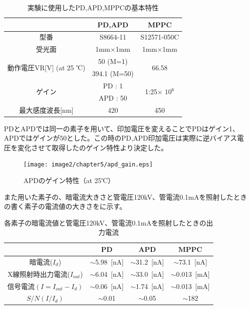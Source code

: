 \begin{table}[H]
  \centering
    \begin{tabular}{ccc}
    \toprule
          & PD,APD  & MPPC \\
    \midrule
    型番    & S8664-11 &  S12571-050C \\
    受光面   & 1mm$\times$1mm & 1mm$\times$1mm \\
    \multirow{2}[0]{*}{動作電圧VR[V] (at 25 ℃)} & 50 (M=1) & \multirow{2}[0]{*}{66.58} \\
          & 394.1 (M=50) &  \\
    \multirow{2}[0]{*}{ゲイン} & PD : 1 & \multirow{2}[0]{*}{1:25$\times$ $10^6$} \\
          & APD : 50 &  \\
    最大感度波長[nm] & 420   & 450 \\
    \bottomrule
    \end{tabular}
     \caption{実験に使用したPD,APD,MPPCの基本特性}
  \label{soshi_tokusei}
\end{table}

PDとAPDでは同一の素子を用いて、印加電圧を変えることでPDはゲイン1、APDではゲインが50とした。この時のPD,APD印加電圧は実際に逆バイアス電圧を変化させて取得したのゲイン特性より決定した。

\begin{figure}[H]
 \begin{center}
 \texttt{[image: image2/chapter5/apd\_gain.eps]}
 \end{center}
 \caption{APDのゲイン特性（at 25℃）}
 \label{fig:apd_gain}
\end{figure}

また用いた素子の、暗電流大きさと管電圧120kV、管電流0.1mAを照射したときの書く素子の電流値の大きさをに示す。


\begin{table}[H]
  \centering
  \caption{各素子の暗電流値と管電圧120kV、管電流0.1mAを照射したときの出力電流}
    \begin{tabular}{cccc}
    \toprule
          & PD    & APD   & MPPC \\
    \midrule
    暗電流($I_d$) & $\sim$5.98\ [nA] & $\sim$31.2\ [nA] & $\sim$73.1\ [nA] \\
    X線照射時出力電流($I_{out}$) & $\sim$6.04\ [nA] & $\sim$33.0\ [nA] & $\sim$0.013\ [mA] \\
    $信号電流(I = I_{out} - I_d)$ & $\sim$0.06\ [nA] & $\sim$1.74\ [nA] & $\sim$0.013\ [mA] \\
    $S/N(I/I_d)$ & $\sim$0.01  & $\sim$0.05  & $\sim$182  \\
    \bottomrule
    \end{tabular}%
  \label{tab:dark_current}%
\end{table}%

